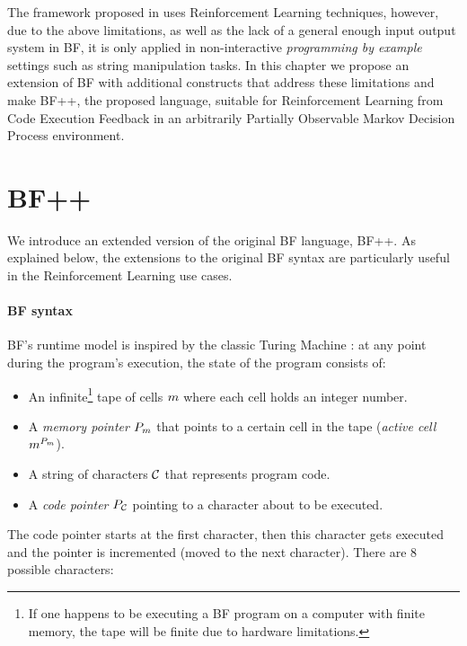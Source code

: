 The framework proposed in \cite{abolafiaNeuralProgramSynthesis2018} uses Reinforcement Learning techniques, however, due to the above limitations, as well as the lack of a general enough input output system in BF, it is only applied in non-interactive \emph{programming by example} settings such as string manipulation tasks.
In this chapter we propose an extension of BF with additional constructs that address these limitations and make BF++, the proposed language, suitable for Reinforcement Learning from Code Execution Feedback in an arbitrarily Partially Observable Markov Decision Process environment.

\newpage
\section{BF++}
\label{sec:language}

We introduce an extended version of the original BF language, BF++. 
As explained below, the extensions to the original BF syntax are particularly useful in the Reinforcement Learning use cases. 

\paragraph{BF syntax}
\label{sec:bf}

BF's runtime model is inspired by the classic Turing Machine \cite{turing}: at any point during the program's execution, the state of the program consists of:

\begin{itemize}
    \item An infinite\footnote{If one happens to be executing a BF program on a computer with finite memory, the tape will be finite due to hardware limitations.} tape of cells $m$ where each cell holds an integer number.
    \item A \textit{memory pointer} $P_m$ that points to a certain cell in the tape (\textit{active cell} $m^{P_m}$).
    \item A string of characters $\mathcal{C}$ that represents program code.
    \item A \textit{code pointer} $P_{\mathcal{C}}$ pointing to a character about to be executed.
\end{itemize}

The code pointer starts at the first character, then this character gets executed and the pointer is incremented (moved to the next character).
There are 8 possible characters:

